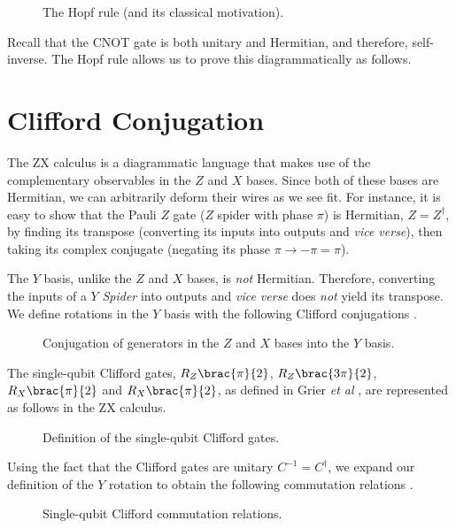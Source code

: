 \begin{figure}[H]
    \centering
    \caption{The Hopf rule (and its classical motivation).}
    \label{hopf}
\end{figure}

Recall that the CNOT gate is both unitary and Hermitian, and therefore, self-inverse. The Hopf rule allows us to prove this diagrammatically as follows.



\section{Clifford Conjugation}%
\label{clifford-conjugation}

The ZX calculus is a diagrammatic language that makes use of the complementary observables in the $Z$ and $X$ bases. Since both of these bases are Hermitian, we can arbitrarily deform their wires as we see fit. For instance, it is easy to show that the Pauli $Z$ gate ($Z$ spider with phase $\pi$) is Hermitian, $Z = Z^\dagger$, by finding its transpose (converting its inputs into outputs and \textit{vice verse}), then taking its complex conjugate (negating its phase $\pi \rightarrow -\pi = \pi$).


The $Y$ basis, unlike the $Z$ and $X$ bases, is \textit{not} Hermitian. Therefore, converting the inputs of a $Y$ \textit{Spider} into outputs and \textit{vice verse} does \textit{not} yield its transpose. We define rotations in the $Y$ basis with the following Clifford conjugations \cite{Yeung2020}.

\begin{figure}[H]
    \centering
    \caption{Conjugation of generators in the $Z$ and $X$ bases into the $Y$ basis.}
    \label{pauli-Y}
\end{figure}

The single-qubit Clifford gates, $R_Z \brac{\pi}{2}$, $R_Z \brac{3\pi}{2}$, $R_X \brac{\pi}{2}$ and $R_X \brac{\pi}{2}$, as defined in Grier \textit{et al} \cite{Grier2016}, are represented as follows in the ZX calculus.

\begin{figure}[H]
    \centering
    \caption{Definition of the single-qubit Clifford gates.}
    \label{clifford-definitions}
\end{figure}


Using the fact that the Clifford gates are unitary $C^{-1} = C^\dagger$, we expand our definition of the $Y$ rotation to obtain the following commutation relations \cite{Yeung2020}.


\begin{figure}[H]
    \centering
    \caption{Single-qubit Clifford commutation relations.}
    \label{clifford-commutation}
\end{figure}

